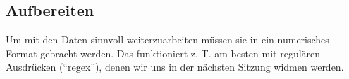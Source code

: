 \documentclass[
  ngerman,
]{article}
\newenvironment{Shaded}{\begin{snugshade}}{\end{snugshade}}
\newcommand{\DocumentationTok}[1]{\textcolor[rgb]{0.56,0.35,0.01}{\textbf{\textit{#1}}}}
\newcommand{\NormalTok}[1]{#1}
\newcommand{\SpecialCharTok}[1]{\textcolor[rgb]{0.00,0.00,0.00}{#1}}
\begin{document}
\hypertarget{aufbereiten}{%
\subsection{Aufbereiten}\label{aufbereiten}}

Um mit den Daten sinnvoll weiterzuarbeiten müssen sie in ein numerisches Format gebracht werden. Das funktioniert z. T. am besten mit regulären Ausdrücken (``regex''), denen wir uns in der nächsten Sitzung widmen werden.

\begin{Shaded}
\end{Shaded}
\end{document}
